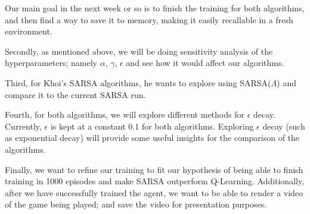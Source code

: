 \documentclass[nohyperref]{article}
\theoremstyle{plain}
\theoremstyle{definition}
\theoremstyle{remark}
\newcommand{\cnote}[1]{\textsf{\color{blue} [#1]}}
\begin{document}
Our main goal in the next week or so is to finish the training for both algorithms, and then find a way to save it to memory, making it easily recallable in a fresh environment.

Secondly, as mentioned above, we will be doing sensitivity analysis of the hyperparameters; namely $\alpha$, $\gamma$, $\epsilon$ and see how it would
affect our algorithms.

Third, for Khoi's SARSA algorithms, he wants to explore using SARSA($\Lambda$) and compare it to the current SARSA run. 

Fourth, for both algorithms, we will explore different methods for $\epsilon$ decay. Currently, $\epsilon$ is kept at a constant 0.1 for both algorithms.
Exploring $\epsilon$ decay (such as exponential decay) will provide some useful insights for the comparison of the algorithms.

Finally, we want to refine our training to fit our hypothesis of being able to finish training in 1000 episodes and make SARSA outperform Q-Learning.
Additionally, after we have successfully trained the agent, we want to be able to render a video of the game being played; and save the video for presentation purposes.



\end{document}
